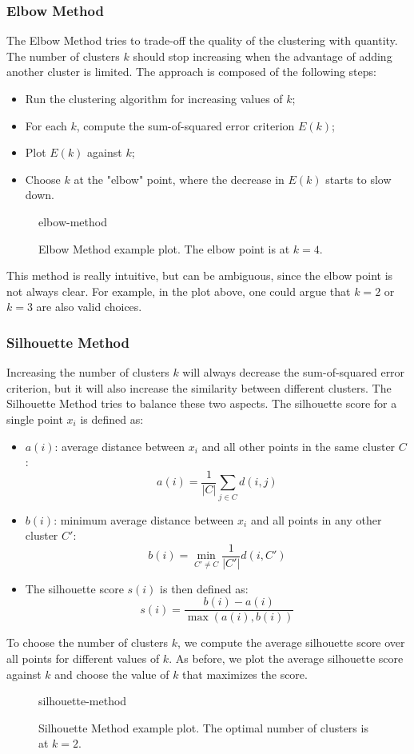 \subsubsection{Elbow Method}
The Elbow Method tries to trade-off the quality of the clustering with quantity. The number of clusters $k$ should stop 
increasing when the advantage of adding another cluster is limited.
The approach is composed of the following steps:
\begin{itemize}
    \item Run the clustering algorithm for increasing values of $k$;
    \item For each $k$, compute the sum-of-squared error criterion $E(k)$;
    \item Plot $E(k)$ against $k$;
    \item Choose $k$ at the "elbow" point, where the decrease in $E(k)$ starts to slow down.
\end{itemize}
\begin{figure}[H]
    \centering
    {elbow-method}
    \caption{Elbow Method example plot. The elbow point is at $k=4$.}
\end{figure}
This method is really intuitive, but can be ambiguous, since the elbow point is not always clear.
For example, in the plot above, one could argue that $k=2$ or $k=3$ are also valid choices.

\subsubsection{Silhouette Method}
Increasing the number of clusters $k$ will always decrease the sum-of-squared error criterion, but it will also increase the 
similarity between different clusters. The Silhouette Method tries to balance these two aspects.
The silhouette score for a single point $x_i$ is defined as:
\begin{itemize}
    \item $a(i)$: average distance between $x_i$ and all other points in the same cluster $C$:
    \[ a(i) = \frac{1}{|C|} \sum_{j \in C} d(i, j) \]
    \item $b(i)$: minimum average distance between $x_i$ and all points in any other cluster $C'$:
    \[ b(i) = \min_{C' \neq C} \frac{1}{|C'|} d(i, C') \]
    \item The silhouette score $s(i)$ is then defined as:
    \[ s(i) = \frac{b(i) - a(i)}{\max(a(i), b(i))} \]
\end{itemize}
To choose the number of clusters $k$, we compute the average silhouette score over all points for different values of $k$. As before,
we plot the average silhouette score against $k$ and choose the value of $k$ that maximizes the score.
\begin{figure}[H]
    \centering
    {silhouette-method}
    \caption{Silhouette Method example plot. The optimal number of clusters is at $k=2$.}
\end{figure}
